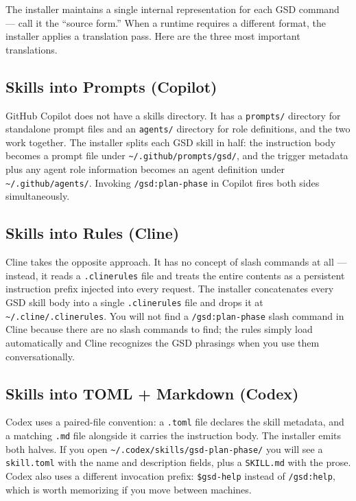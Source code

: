\documentclass[11pt,letterpaper,openany]{book}
\begin{document}
The installer maintains a single internal representation for each GSD
command --- call it the ``source form.'' When a runtime requires a
different format, the installer applies a translation pass. Here are the
three most important translations.

\subsection{Skills into Prompts (Copilot)}

GitHub Copilot does not have a skills directory. It has a
\texttt{prompts/} directory for standalone prompt files and an
\texttt{agents/} directory for role definitions, and the two work
together. The installer splits each GSD skill in half: the instruction
body becomes a prompt file under \texttt{\~{}/.github/prompts/gsd/}, and
the trigger metadata plus any agent role information becomes an agent
definition under \texttt{\~{}/.github/agents/}. Invoking
\texttt{/gsd:plan-phase} in Copilot fires both sides simultaneously.

\subsection{Skills into Rules (Cline)}

Cline takes the opposite approach. It has no concept of slash commands at
all --- instead, it reads a \texttt{.clinerules} file and treats the
entire contents as a persistent instruction prefix injected into every
request. The installer concatenates every GSD skill body into a single
\texttt{.clinerules} file and drops it at
\texttt{\~{}/.cline/.clinerules}. You will not find a
\texttt{/gsd:plan-phase} slash command in Cline because there are no
slash commands to find; the rules simply load automatically and Cline
recognizes the GSD phrasings when you use them conversationally.

\subsection{Skills into TOML + Markdown (Codex)}

Codex uses a paired-file convention: a \texttt{.toml} file declares the
skill metadata, and a matching \texttt{.md} file alongside it carries the
instruction body. The installer emits both halves. If you open
\texttt{\~{}/.codex/skills/gsd-plan-phase/} you will see a
\texttt{skill.toml} with the name and description fields, plus a
\texttt{SKILL.md} with the prose. Codex also uses a different invocation
prefix: \texttt{\$gsd-help} instead of \texttt{/gsd:help}, which is worth
memorizing if you move between machines.
\end{document}
